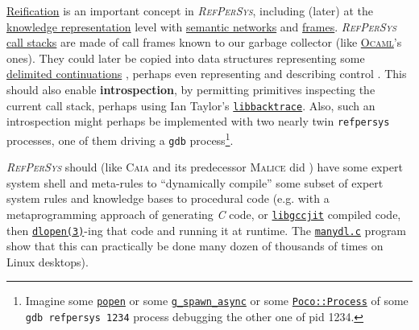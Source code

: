 \documentclass[11pt,a4paper,svgnames]{article}
\newcommand{\RefPerSys}{{\textit{\textsc{RefPerSys}}}}
\begin{document}
\href{https://en.wikipedia.org/wiki/Reification_(computer_science)}{Reification}
is an important concept in \RefPerSys, including (later) at the
\href{https://en.wikipedia.org/wiki/Knowledge_representation_and_reasoning}{knowledge
  representation} level with
\href{https://en.wikipedia.org/wiki/Semantic_network}{semantic
  networks} and
\href{https://en.wikipedia.org/wiki/Frame_(artificial_intelligence)}{frames}. {\RefPerSys}
\href{https://en.wikipedia.org/wiki/Call_stack}{call stacks} are made
of call frames known to our garbage collector (like
\href{https://caml.inria.fr/pub/docs/manual-ocaml/intfc.html}{\textsc{Ocaml}}'s
ones). They could later be copied into data structures representing
some
\href{https://en.wikipedia.org/wiki/Delimited_continuation}{delimited
  continuations} \cite{Reynolds:1993:continuations,
  Queinnec:2004:ContinWeb}, perhaps even representing and describing
control \cite{fouet-starynkevitch:describing-control:1987,
  Starynkevitch-1990-EUM, Pitrat:2009:ArtifBeings}. This should also
enable \textbf{introspection}, by permitting primitives inspecting the
current call stack, perhaps using Ian Taylor's
\href{https://github.com/ianlancetaylor/libbacktrace}{\texttt{libbacktrace}}. Also,
such an introspection might perhaps be implemented \cite{mitchell:2001:alp} with two nearly
twin \texttt{refpersys} processes, one of them driving a \texttt{gdb}
process\footnote{Imagine some
\href{http://man7.org/linux/man-pages/man3/popen.3.html}{\texttt{popen}}
or some
\href{https://developer.gnome.org/glib/stable/glib-Spawning-Processes.html\#g-spawn-async}{\texttt{g\_spawn\_async}}
or some
\href{https://pocoproject.org/docs/Poco.Process.html}{\texttt{Poco::Process}}
of some \texttt{gdb refpersys 1234} process debugging the other one of
pid 1234.}.


{\RefPerSys} should (like \textsc{Caia} and its predecessor
\textsc{Malice} did
\cite{Pitrat:2009:AST,Pitrat:1996:FGCS,Pitrat:2009:ArtifBeings}) have
some expert system shell \cite{kumar:2015:importance-expert-systems,
  nigro:2008:meta} and meta-rules to ``dynamically compile'' some
subset of expert system rules and knowledge bases to procedural code
(e.g. with a metaprogramming approach of generating \emph{C} code, or
\href{https://gcc.gnu.org/onlinedocs/jit/}{\texttt{libgccjit}}
compiled code, then
\href{http://man7.org/linux/man-pages/man3/dlopen.3.html}{\texttt{dlopen(3)}}-ing
that code and running it at runtime. The
\href{https://github.com/bstarynk/misc-basile/blob/master/manydl.c}{\texttt{manydl.c}}
program show that this can practically be done many dozen of thousands
of times on Linux desktops).
\end{document}
